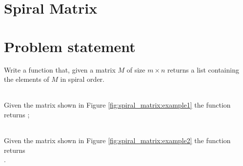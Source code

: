 %



\section{Spiral Matrix}
\label{ch:spiral_matrix}

\section{Problem statement}
Write a function that, given a matrix $M$ of size $m\times n$ returns a list containing the elements of $M$ in spiral order.
\begin{exercise}
\label{example:spiral_matrix:exercice1}

    \begin{example}
        \label{example:spiral_matrix:example1}
        \hfill \\
        Given the matrix shown in Figure \ref{fig:spiral_matrix:example1}  the function returns ;
    \end{example}


    \begin{example}
        \label{example:spiral_matrix:example2}
        \hfill \\
        Given the matrix shown in Figure \ref{fig:spiral_matrix:example2}  the function returns \\ .
    \end{example}

\end{exercise}
